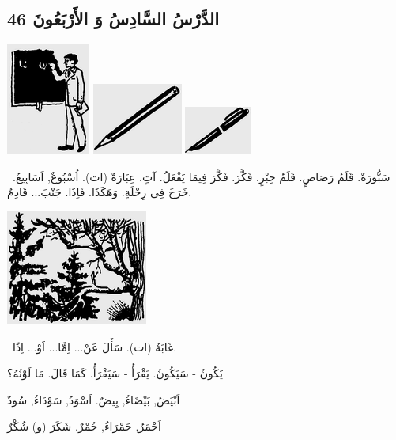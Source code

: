 \documentclass[a5paper]{article}
\begin{document}
\subsection{الدَّرْسُ السَّادِسُ وَ الأَرْبَعُونَ 46}
 \includegraphics[width=1.0835in,height=1.448in]{images/MuhammadBagauddinprettified-img145.png}   \includegraphics[width=1.1665in,height=0.9272in]{images/MuhammadBagauddinprettified-img146.png}   \includegraphics[width=0.8646in,height=0.6252in]{images/MuhammadBagauddinprettified-img147.png} 

\ سَبُّورَةٌ. قَلَمُ رَصَاصٍ. قَلَمُ حِبْرٍ. فَكَّرَ. فَكَّرَ فِيمَا يَفْعَلُ. آتٍ. عِبَارَةٌ (ات). اُسْبُوعٌ, اَسَابِيعُ. خَرَخَ فِى رِحْلَةٍ. وَهَكَذَا. فَاِذَا. جَنْبَ... قَادِمٌ. 

 \includegraphics[width=1.8335in,height=1.4898in]{images/MuhammadBagauddinprettified-img148.png} 

\ غَابَةٌ (ات). سَأَلَ عَنْ... اِمَّا... اَوْ... اِذًا.

يَكُونُ - سَيَكُونُ. يَقْرَأُ - سَيَقْرَأُ. كَمَا قَالَ. مَا لَوْنُهُ؟ 

اَبْيَضُ, بَيْضَاءُ, بِيضٌ. اَسْوَدُ, سَوْدَاءُ, سُودٌ

اَحْمَرُ, حَمْرَاءُ, حُمْرٌ. شَكَرَ (و) شُكْرٌ
\end{document}
